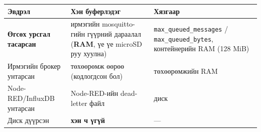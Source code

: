 \begingroup\scriptsize\begin{longtable}[]{@{}lll@{}}
\toprule
\begin{minipage}[b]{0.30\columnwidth}\raggedright
Эвдрэл\strut
\end{minipage} & \begin{minipage}[b]{0.30\columnwidth}\raggedright
Хэн буферлэдэг\strut
\end{minipage} & \begin{minipage}[b]{0.30\columnwidth}\raggedright
Хязгаар\strut
\end{minipage}\tabularnewline
\midrule
\endhead
\begin{minipage}[t]{0.30\columnwidth}\raggedright
\textbf{Өгсөх урсгал тасарсан}\strut
\end{minipage} & \begin{minipage}[t]{0.30\columnwidth}\raggedright
ирмэгийн mosquitto-гийн гүүрний дараалал (\textbf{RAM}, үе үе microSD руу хуулна)\strut
\end{minipage} & \begin{minipage}[t]{0.30\columnwidth}\raggedright
\texttt{max\_\allowbreak{}queued\_\allowbreak{}messages} / \texttt{max\_\allowbreak{}queued\_\allowbreak{}bytes}, контейнерийн RAM (128 MiB)\strut
\end{minipage}\tabularnewline
\begin{minipage}[t]{0.30\columnwidth}\raggedright
Ирмэгийн брокер унтарсан\strut
\end{minipage} & \begin{minipage}[t]{0.30\columnwidth}\raggedright
төхөөрөмж өөрөө (кодлогдсон бол)\strut
\end{minipage} & \begin{minipage}[t]{0.30\columnwidth}\raggedright
төхөөрөмжийн RAM\strut
\end{minipage}\tabularnewline
\begin{minipage}[t]{0.30\columnwidth}\raggedright
Node-RED/InfluxDB унтарсан\strut
\end{minipage} & \begin{minipage}[t]{0.30\columnwidth}\raggedright
Node-RED-ийн dead-letter файл\strut
\end{minipage} & \begin{minipage}[t]{0.30\columnwidth}\raggedright
диск\strut
\end{minipage}\tabularnewline
\begin{minipage}[t]{0.30\columnwidth}\raggedright
Диск дүүрсэн\strut
\end{minipage} & \begin{minipage}[t]{0.30\columnwidth}\raggedright
\textbf{хэн ч үгүй}\strut
\end{minipage} & \begin{minipage}[t]{0.30\columnwidth}\raggedright
---\strut
\end{minipage}\tabularnewline
\bottomrule
\end{longtable}\endgroup

